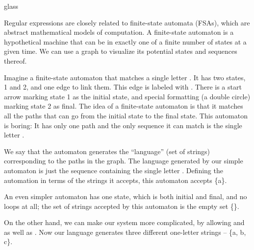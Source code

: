 \begin{tblsfilledsymbol}{}{glass} \label{ufsa}
\begin{underthehood} 

Regular expressions are closely related to finite-state automata (FSAs), which are abstract mathematical models of computation. A finite-state automaton is a hypothetical machine that can be in exactly one of a finite number of states at a given time.  We can use a graph to visualize its potential states and sequences thereof.

Imagine a finite-state automaton that matches a single letter . It has two states, 1 and 2, and one edge to link them. This edge is labeled with . There is a start arrow marking state 1 as the initial state, and special formatting (a double circle) marking state 2 as final. The idea of a finite-state automaton is that it matches all the paths that can go from the initial state to the final state. This automaton is boring: It has only one path and the only sequence it can match is the single letter . 

\begin{figure}[H]
\end{figure}

We say that the automaton generates the ``language'' (set of strings) corresponding to the paths in the graph. The language generated by our simple automaton is just the sequence containing the single letter .  Defining the automation in terms of the strings it accepts, this automaton accepts \{a\}.

An even simpler automaton has one state, which is both initial and final, and no loops at all; the set of strings accepted by this automaton is the empty set \{\}.

\begin{figure}[H]
\end{figure}

On the other hand, we can make our system more complicated, by allowing  and  as well as .  Now our language generates three different one-letter strings -- \{a, b, c\}.


\end{underthehood}
\end{tblsfilledsymbol}
